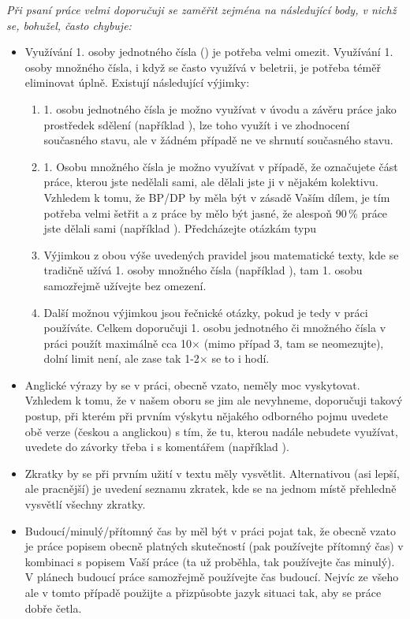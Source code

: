 \it Při psaní práce velmi doporučuji se zaměřit zejména na následující body, v nichž se, bohužel, často chybuje:
\begin{itemize}
  \item{Využívání 1. osoby jednotného čísla () je potřeba velmi omezit. Využívání 1. osoby množného čísla, i když se často využívá v beletrii, je potřeba téměř eliminovat úplně. Existují následující výjimky:
    \begin{enumerate}
      \item{1. osobu jednotného čísla je možno využívat v úvodu a závěru práce jako prostředek sdělení  (například ), lze toho využít i ve zhodnocení současného stavu, ale v žádném případě ne ve shrnutí současného stavu.}
      \item{1. Osobu množného čísla je možno využívat v případě, že označujete část práce, kterou jste nedělali sami, ale dělali jste ji v nějakém kolektivu. Vzhledem k tomu, že BP/DP by měla být v zásadě Vaším dílem, je tím potřeba velmi šetřit a z práce by mělo být jasné, že alespoň 90\,\% práce jste dělali sami (například ). Předcházejte otázkám typu }
      \item{Výjimkou z obou výše uvedených pravidel jsou matematické texty, kde se tradičně užívá 1. osoby množného čísla (například ), tam 1. osobu samozřejmě užívejte bez omezení.}
      \item{Další možnou výjimkou jsou řečnické otázky, pokud je tedy v práci používáte. Celkem doporučuji 1. osobu jednotného či množného čísla v práci použít maximálně cca 10$\times$ (mimo případ 3, tam se neomezujte), dolní limit není, ale zase tak 1-2$\times$ se to i hodí.}
    \end{enumerate}}
  \item{Anglické výrazy by se v práci, obecně vzato, neměly moc vyskytovat. Vzhledem k tomu, že v našem oboru se jim ale nevyhneme, doporučuji takový postup, při kterém při prvním výskytu nějakého odborného pojmu uvedete obě verze (českou a anglickou) s tím, že tu, kterou nadále nebudete využívat, uvedete do závorky třeba i s komentářem (například ).}
  \item{Zkratky by se při prvním užití v textu měly vysvětlit. Alternativou (asi lepší, ale pracnější) je uvedení seznamu zkratek, kde se na jednom místě přehledně vysvětlí všechny zkratky.}
  \item{Budoucí/minulý/přítomný čas by měl být v práci pojat tak, že obecně vzato je práce popisem obecně platných skutečností (pak používejte přítomný čas) v kombinaci s popisem Vaší práce (ta už proběhla,
tak používejte čas minulý). V plánech budoucí práce samozřejmě používejte čas budoucí. Nejvíc ze
všeho ale v tomto případě použijte  a přizpůsobte jazyk situaci tak, aby se práce dobře četla.}
\end{itemize}
\rm



